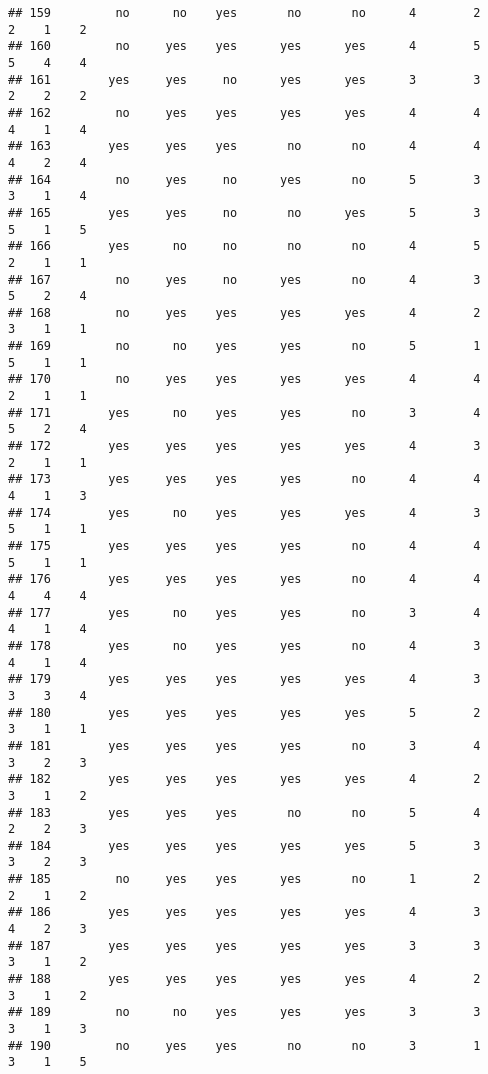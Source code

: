 \documentclass[
]{article}
\begin{document}
\begin{verbatim}
## 159         no      no    yes       no       no      4        2     2    1    2
## 160         no     yes    yes      yes      yes      4        5     5    4    4
## 161        yes     yes     no      yes      yes      3        3     2    2    2
## 162         no     yes    yes      yes      yes      4        4     4    1    4
## 163        yes     yes    yes       no       no      4        4     4    2    4
## 164         no     yes     no      yes       no      5        3     3    1    4
## 165        yes     yes     no       no      yes      5        3     5    1    5
## 166        yes      no     no       no       no      4        5     2    1    1
## 167         no     yes     no      yes       no      4        3     5    2    4
## 168         no     yes    yes      yes      yes      4        2     3    1    1
## 169         no      no    yes      yes       no      5        1     5    1    1
## 170         no     yes    yes      yes      yes      4        4     2    1    1
## 171        yes      no    yes      yes       no      3        4     5    2    4
## 172        yes     yes    yes      yes      yes      4        3     2    1    1
## 173        yes     yes    yes      yes       no      4        4     4    1    3
## 174        yes      no    yes      yes      yes      4        3     5    1    1
## 175        yes     yes    yes      yes       no      4        4     5    1    1
## 176        yes     yes    yes      yes       no      4        4     4    4    4
## 177        yes      no    yes      yes       no      3        4     4    1    4
## 178        yes      no    yes      yes       no      4        3     4    1    4
## 179        yes     yes    yes      yes      yes      4        3     3    3    4
## 180        yes     yes    yes      yes      yes      5        2     3    1    1
## 181        yes     yes    yes      yes       no      3        4     3    2    3
## 182        yes     yes    yes      yes      yes      4        2     3    1    2
## 183        yes     yes    yes       no       no      5        4     2    2    3
## 184        yes     yes    yes      yes      yes      5        3     3    2    3
## 185         no     yes    yes      yes       no      1        2     2    1    2
## 186        yes     yes    yes      yes      yes      4        3     4    2    3
## 187        yes     yes    yes      yes      yes      3        3     3    1    2
## 188        yes     yes    yes      yes      yes      4        2     3    1    2
## 189         no      no    yes      yes      yes      3        3     3    1    3
## 190         no     yes    yes       no       no      3        1     3    1    5

\end{verbatim}
\end{document}
